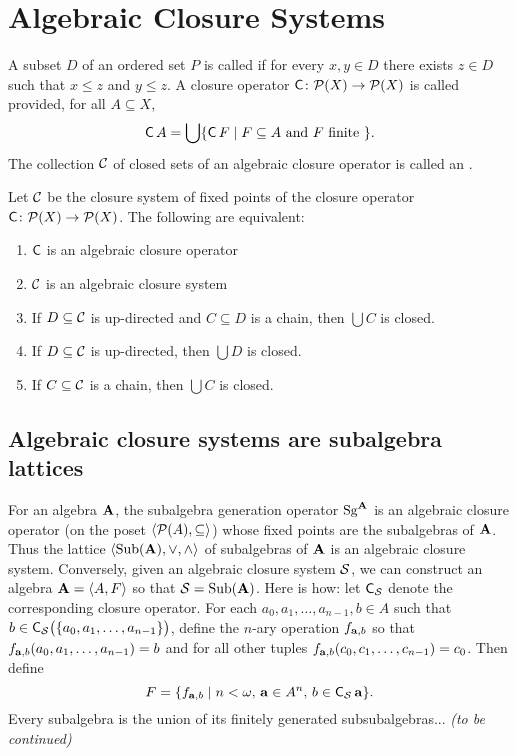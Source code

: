 \section{Algebraic Closure Systems}
A subset $D$ of an ordered set $P$ is called 
if for every $x, y \in D$ there exists $z \in D$ such that
$x \leq z$ and $y \leq z$. 
A closure operator $\operatorname{\mathsf{C}}\colon \mathcal{P}(X) \to \mathcal{P}(X)$ is called  provided,
for all $A\subseteq X$, 
\[
\operatorname{\mathsf{C}} A = \bigcup \{\operatorname{\mathsf{C}} F \mid F \subseteq A \text{ and } F \text{ finite } \}.
\]
The collection $\mathcal{C}$ of closed sets of an algebraic closure operator is called an
.
\begin{theorem}
  Let $\mathcal{C}$ be the closure system of fixed points of the closure operator $\operatorname{\mathsf{C}}\colon \mathcal{P}(X) \to \mathcal{P}(X)$.
  The following are equivalent:
\begin{enumerate}
\item $\operatorname{\mathsf{C}}$ is an algebraic closure operator
\item $\mathcal{C}$ is an algebraic closure system
\item If $D\subseteq \mathcal{C}$ is up-directed and $C\subseteq D$ is a chain, then $\bigcup C$ is closed.
\item If $D\subseteq \mathcal{C}$ is up-directed, then $\bigcup D$ is closed.
\item If $C\subseteq \mathcal{C}$ is a chain, then $\bigcup C$ is closed.
\end{enumerate}
\end{theorem}

\subsection{Algebraic closure systems are subalgebra lattices}
For an algebra $\mathbf{A}$, the subalgebra generation operator $\operatorname{Sg}^{\mathbf{A}}$ is an algebraic
closure operator (on the poset $\langle\mathcal{P}(A), \subseteq\rangle$) whose fixed points are the
subalgebras of $\mathbf{A}$.
Thus the lattice $\langle\operatorname{Sub}(\mathbf{A}), \vee, \wedge\rangle$ of subalgebras of $\mathbf{A}$ is an algebraic closure
system.
Conversely, given an algebraic closure system $\mathcal{S}$, we can construct an algebra
$\mathbf{A} =\langle A, F\rangle$ so that $\mathcal{S} = \operatorname{Sub}(\mathbf{A})$.
Here is how: let $\operatorname{\mathsf{C}}_{\mathcal{S}}$ denote the corresponding closure operator.
For each $a_0, a_1, \dots, a_{n-1}, b \in A$ such that
$b \in \operatorname{\mathsf{C}}_{\mathcal{S}} \bigl(\{a_0, a_1, \dots, a_{n-1}\}\bigr)$, define the $n$-ary operation
$f_{\mathbf{a}, b}$ so that $f_{\mathbf{a}, b}(a_0, a_1, \dots, a_{n-1}) = b$ and
for all other tuples $f_{\mathbf{a}, b}(c_0, c_1, \dots, c_{n-1}) = c_0$.
Then define
\[
F = \{f_{\mathbf{a}, b} \mid  n< \omega, \, \mathbf{a} \in A^n,  \, b \in \operatorname{\mathsf{C}}_{\mathcal{S}} \mathbf{a}\}.
\]
Every subalgebra is the union of its finitely generated subsubalgebras...
{\it (to be continued)}

